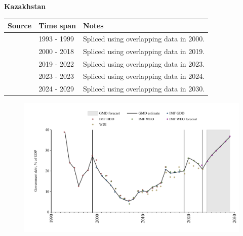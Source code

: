 \documentclass[12pt,a4paper,landscape]{article}
\begin{document}
\begin{adjustbox}{max totalsize={\paperwidth}{\paperheight},center}
\begin{minipage}[t][\textheight][t]{\textwidth}
\vspace*{0.5cm}
{}
\begin{center}
{\Large\bfseries Kazakhstan}
\end{center}
\vspace{0.5cm}
\begin{table}[H]
\centering
\small
\begin{tabular}{|l|l|l|}
\hline
\textbf{Source} & \textbf{Time span} & \textbf{Notes} \\
\hline
\rowcolor{white}\cite{IMF_HDD}& 1993 - 1999 &Spliced using overlapping data in 2000.\\
\rowcolor{lightgray}\cite{IMF_GDD}& 2000 - 2018 &Spliced using overlapping data in 2019.\\
\rowcolor{white}\cite{IMF_WEO}& 2019 - 2022 &Spliced using overlapping data in 2023.\\
\rowcolor{lightgray}\cite{WDI}& 2023 - 2023 &Spliced using overlapping data in 2024.\\
\rowcolor{white}\cite{IMF_WEO_forecast}& 2024 - 2029 &Spliced using overlapping data in 2030.\\
\hline
\end{tabular}
\end{table}
\begin{figure}[H]
\centering
\includegraphics[width=\textwidth,height=0.6\textheight,keepaspectratio]{graphs/KAZ_govdebt_GDP.pdf}
\end{figure}
\end{minipage}
\end{adjustbox}
\end{document}
